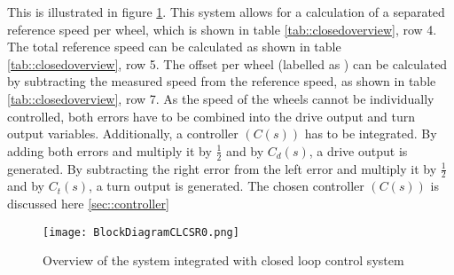 This is illustrated in figure \ref{fig::controldiagram}.
This system allows for a calculation of a separated reference speed per wheel, which is shown in table \ref{tab::closedoverview}, row 4.
The total reference speed can be calculated as shown in table \ref{tab::closedoverview}, row 5.
The offset per wheel (labelled as ) can be calculated by subtracting the measured speed from the reference speed, as shown in table \ref{tab::closedoverview}, row 7.
As the speed of the wheels cannot be individually controlled, both errors have to be combined into the drive output and turn output variables.
Additionally, a controller $(C(s))$ has to be integrated.
By adding both errors and multiply it by $ \frac{1}{2} $ and by $C_d(s)$, a drive output is generated. By subtracting the right error from the left error and multiply it by $ \frac{1}{2} $ and by $C_t(s)$, a turn output is generated. The chosen controller $(C(s))$ is discussed here \ref{sec::controller}

\begin{figure}[H]
\centering
\texttt{[image: BlockDiagramCLCSR0.png]}
\caption{Overview of the system integrated with closed loop control system}
\label{fig::controldiagram}
\end{figure}


